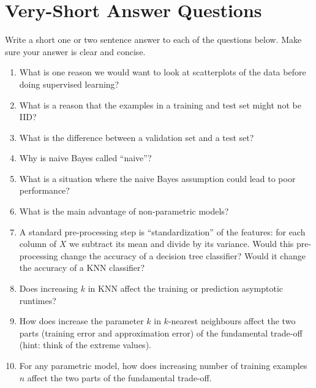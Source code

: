 \documentclass{article}
\def\blu#1{{\color{blu}#1}}
\def\enum#1{\begin{enumerate}#1\end{enumerate}}
\begin{document}
\section{Very-Short Answer Questions}

\blu{Write a short one or two sentence answer to each of the questions below}. Make sure your answer is clear and concise.

\enum{
\item What is one reason we would want to look at scatterplots of the data before doing supervised learning?
\item What is a reason that the examples in a training and test set might not be IID?
\item What is the difference between a validation set and a test set?
\item Why is  naive Bayes called ``naive''?
\item What is a situation where the naive Bayes assumption could lead to poor performance?
\item What is the main advantage of non-parametric models?
\item A standard pre-processing step is ``standardization'' of the features: for each column of $X$ we subtract its mean and divide by its variance. Would this pre-processing change the accuracy of a decision tree classifier? Would it change the accuracy of a KNN classifier?
\item Does increasing $k$ in KNN affect the training or prediction asymptotic runtimes?
\item How does increase the parameter $k$ in $k$-nearest neighbours affect the two parts (training error and approximation error) of the fundamental trade-off (hint: think of the extreme values).
\item For any parametric model, how does increasing number of training examples $n$ affect the two parts of the fundamental trade-off.
}
\end{document}
